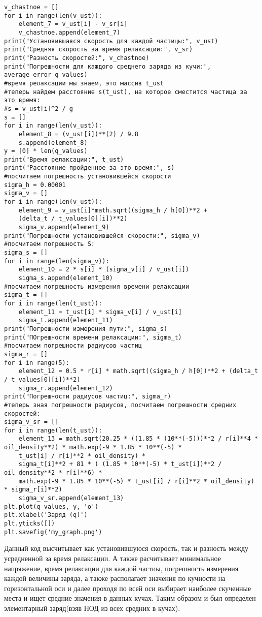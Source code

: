 \documentclass[a4paper,12pt]{article}
\begin{document}
\begin{verbatim}
v_chastnoe = []
for i in range(len(v_ust)):
    element_7 = v_ust[i] - v_sr[i]
    v_chastnoe.append(element_7)
print("Установившаяся скорость для каждой частицы:", v_ust)
print("Средняя скорость за время релаксации:", v_sr)
print("Разность скоростей:", v_chastnoe)
print("Погрешности для каждого среднего заряда из кучи:", average_error_q_values)
#время релаксации мы знаем, это массив t_ust
#теперь найдем расстояние s(t_ust), на которое сместится частица за это время:
#s = v_ust[i]^2 / g
s = []
for i in range(len(v_ust)):
    element_8 = (v_ust[i])**(2) / 9.8
    s.append(element_8)
y = [0] * len(q_values)
print("Время релаксации:", t_ust)
print("Расстояние пройденное за это время:", s)
#посчитаем погрешность установившейся скорости
sigma_h = 0.00001
sigma_v = []
for i in range(len(v_ust)):
    element_9 = v_ust[i]*math.sqrt((sigma_h / h[0])**2 + 
    (delta_t / t_values[0][i])**2)
    sigma_v.append(element_9)
print("Погрешности установившейся скорости:", sigma_v)
#посчитаем погрешность S:
sigma_s = []
for i in range(len(sigma_v)):
    element_10 = 2 * s[i] * (sigma_v[i] / v_ust[i])
    sigma_s.append(element_10)
#посчитаем погрешность измерения времени релаксации
sigma_t = []
for i in range(len(t_ust)):
    element_11 = t_ust[i] * sigma_v[i] / v_ust[i]
    sigma_t.append(element_11)
print("Погрешности измерения пути:", sigma_s)
print("ПОгрешности времени релаксации:", sigma_t)
#посчитаем погрешности радиусов частиц
sigma_r = []
for i in range(5):
    element_12 = 0.5 * r[i] * math.sqrt((sigma_h / h[0])**2 + (delta_t / t_values[0][i])**2)
    sigma_r.append(element_12)
print("Погрешности радиусов частиц:", sigma_r)
#теперь зная погрешности радиусов, посчитаем погрешности средних скоростей:
sigma_v_sr = []
for i in range(len(t_ust)):
    element_13 = math.sqrt(20.25 * ((1.85 * (10**(-5)))**2 / r[i]**4 * oil_density**2) * math.exp(-9 * 1.85 * 10**(-5) * 
    t_ust[i] / r[i]**2 * oil_density) * 
    sigma_t[i]**2 + 81 * ( (1.85 * 10**(-5) * t_ust[i])**2 / oil_density**2 * r[i]**6) *
    math.exp(-9 * 1.85 * 10**(-5) * t_ust[i] / r[i]**2 * oil_density) * sigma_r[i]**2)
    sigma_v_sr.append(element_13)
plt.plot(q_values, y, 'o')
plt.xlabel('Заряд (q)')
plt.yticks([])
plt.savefig('my_graph.png')

\end{verbatim}
Данный код высчитывает как установившуюся скорость, так и разность между усредненной за время релаксации. А также расчитывает минимальное напряжение, время релаксации для каждой частиы, погрешность измерения каждой величины заряда, а также располагает значения по кучности на горизонтальной оси и далее проходя по всей оси выбирает наиболее скученные места и ищет средние значения в данных кучах. Таким образом и был определен элементарный заряд(взяв НОД из всех средних в кучах).
\end{document}

